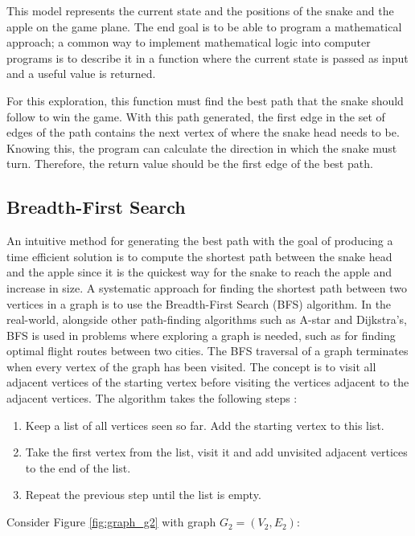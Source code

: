 \documentclass[12pt]{article}
\begin{document}
This model represents the current state and the positions of the snake and the apple on the game plane. The end goal is to be able to program a mathematical approach; a common way to implement mathematical logic into computer programs is to describe it in a function where the current state is passed as input and a useful value is returned.

For this exploration, this function must find the best path that the snake should follow to win the game. With this path generated, the first edge in the set of edges of the path contains the next vertex of where the snake head needs to be. Knowing this, the program can calculate the direction in which the snake must turn. Therefore, the return value should be the first edge of the best path.

\subsection{Breadth-First Search}

An intuitive method for generating the best path with the goal of producing a time efficient solution is to compute the shortest path between the snake head and the apple since it is the quickest way for the snake to reach the apple and increase in size. A systematic approach for finding the shortest path between two vertices in a graph is to use the Breadth-First Search (BFS) algorithm. In the real-world, alongside other path-finding algorithms such as A-star and Dijkstra's, BFS is used in problems where exploring a graph is needed, such as for finding optimal flight routes between two cities. The BFS traversal of a graph terminates when every vertex of the graph has been visited. The concept is to visit all adjacent vertices of the starting vertex before visiting the vertices adjacent to the adjacent vertices. The algorithm takes the following steps \cite{gadagkar2019}:

\begin{enumerate}
	\item Keep a list of all vertices seen so far. Add the starting vertex to this list.
	\item Take the first vertex from the list, visit it and add unvisited adjacent vertices to the end of the list.
	\item Repeat the previous step until the list is empty.
\end{enumerate}

Consider Figure \ref{fig:graph_g2} with graph $G_{2} = (V_{2}, E_{2})$:
\end{document}

